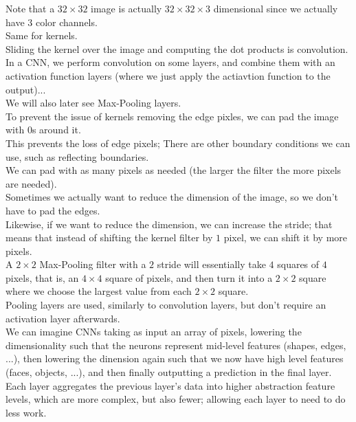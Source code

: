 \documentclass[12pt]{article}
\begin{document}
Note that a $32 \times 32$ image is actually
$32 \times 32 \times 3$ dimensional since we
actually have $3$ color channels. \\
Same for kernels. \\ 

Sliding the kernel over the image and computing
the dot products is convolution. \\

In a CNN, we perform convolution on some layers,
and combine them with an activation function
layers (where we just apply the actiavtion function
to the output)... \\
We will also later see Max-Pooling layers. \\

To prevent the issue of kernels removing the edge
pixles, we can pad the image with $0$s around it. \\
This prevents the loss of edge pixels;
There are other boundary conditions we can use,
such as reflecting boundaries. \\
We can pad with as many pixels as needed
(the larger the filter the more pixels are needed). \\

Sometimes we actually want to reduce the dimension
of the image, so we don't have to pad the edges. \\
Likewise, if we want to reduce the dimension,
we can increase the stride; that means that
instead of shifting the kernel filter by $1$
pixel, we can shift it by more pixels. \\

A $2\times 2$ Max-Pooling filter with a $2$ stride
will essentially take $4$ squares of $4$ pixels,
that is, an $4 \times 4$ square of pixels,
and then turn it into a $2 \times 2$
square where we choose the largest value
from each $2 \times 2$ square. \\

Pooling layers are used, similarly to
convolution layers, but don't require an activation
layer afterwards. \\

We can imagine CNNs taking as input an array of pixels,
lowering the dimensionality such that the neurons
represent mid-level features (shapes, edges, ...),
then lowering the dinension again such that
we now have high level features (faces,
objects, ...), and then finally outputting
a prediction in the final layer. \\
Each layer aggregates the previous layer's data
into higher abstraction feature levels,
which are more complex, but also fewer;
allowing each layer to need to do less work. \\
\end{document}
